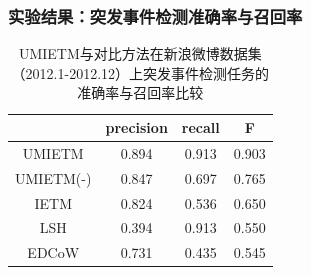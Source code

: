 \begin{frame}
\frametitle{\noindent 实验结果：突发事件检测准确率与召回率}

\begin{table}
\centering
\caption{UMIETM与对比方法在新浪微博数据集（2012.1-2012.12）上突发事件检测任务的准确率与召回率比较}
\begin{tabular}{|c|c|c|c|} \hline
 & precision & recall & F \\ \hline
UMIETM & 0.894 & 0.913 & 0.903\\ \hline
UMIETM(-) & 0.847 & 0.697 & 0.765\\ \hline
IETM & 0.824 & 0.536 & 0.650\\ \hline
LSH & 0.394 & 0.913 & 0.550\\ \hline
EDCoW & 0.731 & 0.435 & 0.545\\ \hline
\end{tabular}
\label{tab:metrics}
\end{table}
\end{frame}

